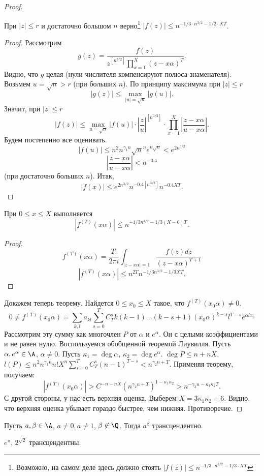 \begin{proof}
\begin{lemma}
    При $|z| \leqslant r$ и достаточно большом $n$ верно\footnote{Возможно, на самом деле здесь должно стоять $|f(z)| \leqslant n^{-1/3 \cdot n^{3/2} - 1/3 \cdot X T}$} $|f(z)| \leqslant n^{-1/3 \cdot n^{3/2} - 1/2 \cdot X T}$.
  \end{lemma}
  \begin{proof}
    Рассмотрим
    $$
      g(z) = \frac{f(z)}{z^{[n^{3/2}]} \prod_{x=1}^X (z - x\alpha)^T}.
    $$
    Видно, что $g$ целая (нули числителя компенсируют полюса знаменателя). Возьмем $u = \sqrt{n} > r$ (при больших $n$). По принципу максимума при $|z| \leqslant r$
    $$
      |g(z)| \leqslant \max_{|u| = \sqrt{n}} |g(u)|.
    $$
    Значит, при $|z| \leqslant r$
    $$
      |f(z)| \leqslant \max_{u = \sqrt{n}} |f(u)| \cdot \left| \frac{z}{u}\right|^{\left[ n^{3/2} \right]} \cdot \prod_{x=1}^{X} \left| \frac{z - x\alpha}{u - x\alpha} \right|.
    $$
    Будем постепенно все оценивать.
    $$
      |f(u)| \leqslant n^2 n^{\gamma_1 n} \sqrt{n}^n e^{n \sqrt{n}} < e^{2n^{3/2}}
    $$
    $$
      \left| \frac{z - x\alpha}{u - x\alpha} \right| < n^{-0.4}
    $$
    (при достаточно больших $n$).
    Итак,
    $$
      |f(x)| \leqslant e^{2n^{3/2}} n^{-0.4 [n^{3/2}]} n^{-0.4 X T}.
    $$
  \end{proof}
  \begin{lemma}
    При $0 \leqslant x \leqslant X$ выполняется
    $$
      |f^{(T)}(x \alpha)| \leqslant n^{-1/3 n^{3/2}-1/3(X-6)T}.
    $$
  \end{lemma}
  \begin{proof}
    $$
      f^{(T)}(x \alpha) = \frac{T!}{2 \pi i} \int_{|z - x \alpha| = 1} \frac{f(z) dz}{(z - x \alpha)^{T+1}}
    $$
    $$
      |f^{(T)}(x \alpha)| \leqslant n^{2T} n^{-1/3 n^{3/2} - 1/3 X T}.
    $$
  \end{proof}

  Докажем теперь теорему. Найдется $0 \leqslant x_0 \leqslant X$ такое, что $f^{(T)}(x_0 \alpha) \ne 0$.
  $$
    0 \ne f^{(T)}(x_0 \alpha) = \sum_{k, l} a_{kl} \sum_{s=0}^{T}C_T^s k (k-1) \ldots (k-s+1) (x_0 \alpha)^{k-s} l^{T-s} e^{\alpha l x_0}
  $$
  Рассмотрим эту сумму как многочлен $P$ от $\alpha$ и $e^{\alpha}$. Он с целыми коэффициентами и не равен нулю. Воспользуемся обобщенной теоремой Лиувилля. Пусть $\alpha, e^{\alpha} \in \A$, $\alpha \ne 0$. Пусть $\kappa_1 = \deg \alpha$, $\kappa_2 = \deg e^{\alpha}$. $\deg P \leqslant n + nX$. $l(P) \leqslant n^2 n^{\gamma_1 n} n! X^n \sum_{s=0}^T C_T^s (n - 1)^{T - s} < n^{\gamma_2 n + T}$. Применяя теорему, получаем:
  $$
    |f^{(T)}(x_0 \alpha)| > C^{-n - nX}(n^{\gamma_2 n + T})^{1 - \kappa_1 \kappa_2} > n^{-\gamma_3 n - \kappa_1 \kappa_2 T}.
  $$
  С другой стороны, у нас есть верхняя оценка. Выберем $X = 3 \kappa_1 \kappa_2 + 6$. Видно, что верхняя оценка убывает гораздо быстрее, чем нижняя. Противоречие.
\end{proof}

\begin{theorem}
  Пусть $a, \beta \in \A$, $a \ne 0, a \ne 1$, $\beta \not \in \Q$. Тогда $a^{\beta}$ трансцендентно.
\end{theorem}
\begin{imp}
  $e^{\pi}$, $2^{\sqrt{2}}$ трансцендентны.
\end{imp}
